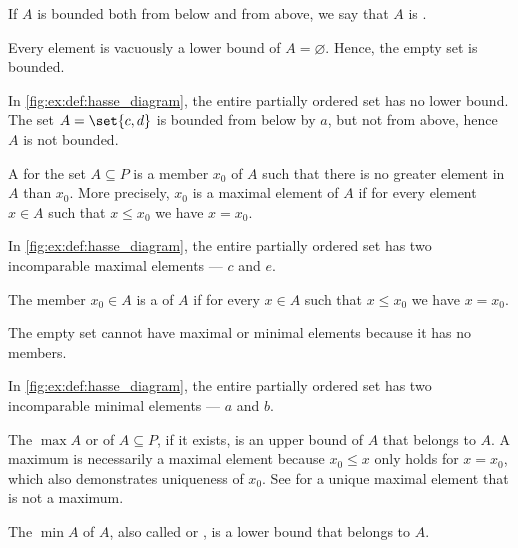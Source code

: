\begin{definition}
\begin{thmenum}
\begin{minipage}[t]{0.45\textwidth}
      If \( A \) is bounded both from below and from above, we say that \( A \) is .

      Every element is vacuously a lower bound of \( A = \varnothing \). Hence, the empty set is bounded.

      In \cref{fig:ex:def:hasse_diagram}, the entire partially ordered set has no lower bound. The set \( A = \set{ c, d } \) is bounded from below by \( a \), but not from above, hence \( A \) is not bounded.
    \end{minipage}

    \begin{minipage}[t]{0.45\textwidth}
      A  for the set \( A \subseteq P \) is a member \( x_0 \) of \( A \) such that there is no greater element in \( A \) than \( x_0 \). More precisely, \( x_0 \) is a maximal element of \( A \) if for every element \( x \in A \) such that \( x \leq x_0 \) we have \( x = x_0 \).

      In \cref{fig:ex:def:hasse_diagram}, the entire partially ordered set has two incomparable maximal elements --- \( c \) and \( e \).
    \end{minipage}
    \hspace{0.02\textwidth}
    \begin{minipage}[t]{0.45\textwidth}
      The member \( x_0 \in A \) is a  of \( A \) if for every \( x \in A \) such that \( x \leq x_0 \) we have \( x = x_0 \).

      The empty set cannot have maximal or minimal elements because it has no members.

      In \cref{fig:ex:def:hasse_diagram}, the entire partially ordered set has two incomparable minimal elements --- \( a \) and \( b \).
    \end{minipage}

    \begin{minipage}[t]{0.45\textwidth}
      The  \( \max A \) or  of \( A \subseteq P \), if it exists, is an upper bound of \( A \) that belongs to \( A \). A maximum is necessarily a maximal element because \( x_0 \leq x \) only holds for \( x = x_0 \), which also demonstrates uniqueness of \( x_0 \). See  for a unique maximal element that is not a maximum.
    \end{minipage}
    \hspace{0.02\textwidth}
    \begin{minipage}[t]{0.45\textwidth}
      The  \( \min A \) of \( A \), also called  or , is a lower bound that belongs to \( A \).


\end{minipage}
\end{thmenum}
\end{definition}
